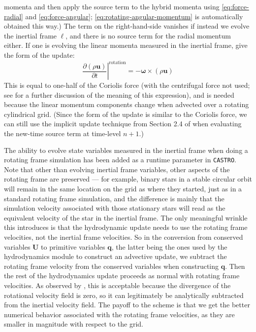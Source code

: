 \documentclass[twocolumn,numberedappendix]{../aastex60}
\newcommand{\castro}{\texttt{CASTRO}}
\begin{document}
momenta and then apply the source term to the hybrid momenta using \autoref{eq:force-radial} and
\autoref{eq:force-angular}; \autoref{eq:rotating-angular-momentum} is automatically obtained this way.)
The term on the right-hand-side vanishes if instead we evolve the inertial frame $\ell$, and there
is no source term for the radial momentum either. If one is evolving the linear momenta measured
in the inertial frame, \cite{byerly:2014} give the form of the update:
\begin{equation}
  \left.\frac{\partial (\rho \mathbf{u})}{\partial t}\right|^{\text{rotation}} = -{\bm{\omega}} \times (\rho \mathbf{u})
\end{equation}
This is equal to one-half of the Coriolis force (with the centrifugal force not used; see
\cite{call:2010} for a further discussion of the meaning of this expression),
and is needed because the linear momentum components change when advected over a
rotating cylindrical grid. (Since the form of the update is similar to the Coriolis force,
we can still use the implicit update technique from Section 2.4 of \cite{wdmergerI} when
evaluating the new-time source term at time-level $n+1$.)

The ability to evolve state variables measured in the inertial frame when doing a
rotating frame simulation has been added as a runtime parameter in \castro. Note that
other than evolving inertial frame variables, other aspects of the rotating frame are
preserved --- for example, binary stars in a stable circular orbit will remain in the same
location on the grid as where they started, just as in a standard rotating frame simulation,
and the difference is mainly that the simulation velocity associated with those stationary
stars will read as the equivalent velocity of the star in the inertial frame. The only
meaningful wrinkle this introduces is that the hydrodynamic update needs to use the
rotating frame velocities, not the inertial frame velocities. So in the conversion from
conserved variables $\mathbf{U}$ to primitive variables $\mathbf{q}$, the latter being
the ones used by the hydrodynamics module to construct an advective update, we subtract
the rotating frame velocity from the conserved variables when constructing $\mathbf{q}$.
Then the rest of the hydrodynamics update proceeds as normal with rotating frame velocities.
As observed by \citet{byerly:2014}, this is acceptable because the divergence of the
rotational velocity field is zero, so it can legitimately be analytically subtracted
from the inertial velocity field. The payoff to the scheme is that we get the better
numerical behavior associated with the rotating frame velocities, as they are smaller
in magnitude with respect to the grid.
\end{document}
